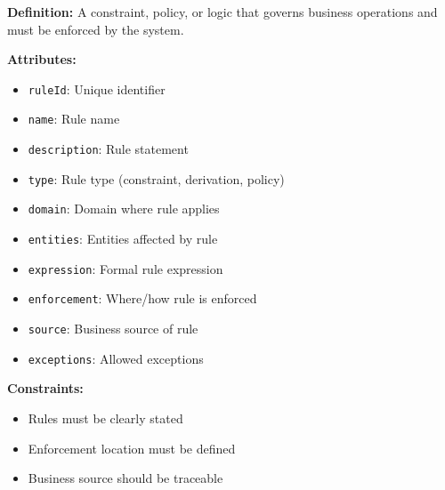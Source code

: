 \documentclass[11pt,letterpaper]{article}
\begin{document}
\begin{definitionbox}
\textbf{Definition:} A constraint, policy, or logic that governs business operations and must be enforced by the system.

\textbf{Attributes:}
\begin{itemize}[nosep]
    \item \texttt{ruleId}: Unique identifier
    \item \texttt{name}: Rule name
    \item \texttt{description}: Rule statement
    \item \texttt{type}: Rule type (constraint, derivation, policy)
    \item \texttt{domain}: Domain where rule applies
    \item \texttt{entities}: Entities affected by rule
    \item \texttt{expression}: Formal rule expression
    \item \texttt{enforcement}: Where/how rule is enforced
    \item \texttt{source}: Business source of rule
    \item \texttt{exceptions}: Allowed exceptions
\end{itemize}

\textbf{Constraints:}
\begin{itemize}[nosep]
    \item Rules must be clearly stated
    \item Enforcement location must be defined
    \item Business source should be traceable
\end{itemize}
\end{definitionbox}
\end{document}
